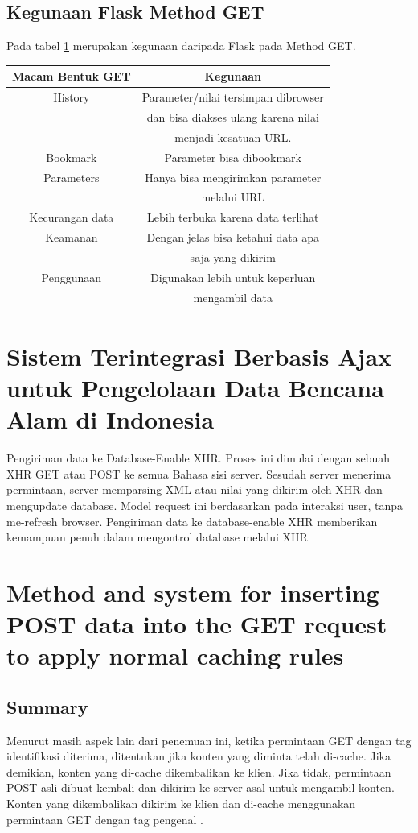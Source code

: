 \subsection{Kegunaan Flask Method GET}
Pada tabel \ref{table:contoh} merupakan kegunaan daripada Flask pada Method GET.
\begin{table}[h]
\begin{tabular}{|c|c|}
\hline
Macam Bentuk GET&Kegunaan\\
\hline
History&Parameter/nilai tersimpan dibrowser\\
&dan bisa diakses ulang karena nilai\\
&menjadi kesatuan URL.\\
Bookmark&Parameter bisa dibookmark\\
Parameters&Hanya bisa mengirimkan parameter\\
&melalui URL\\
Kecurangan data&Lebih terbuka karena data terlihat\\
Keamanan&Dengan jelas bisa ketahui data apa \\
&saja yang dikirim\\
Penggunaan&Digunakan lebih untuk keperluan \\
&mengambil data\\
\hline
\end{tabular}
\label{table:contoh}
\end{table}

\section{Sistem Terintegrasi Berbasis Ajax untuk Pengelolaan Data Bencana Alam di Indonesia}
Pengiriman data ke Database-Enable XHR. Proses ini dimulai dengan sebuah XHR GET atau POST ke semua Bahasa sisi server. Sesudah server menerima permintaan, server memparsing XML atau nilai yang dikirim oleh XHR dan mengupdate database. Model request ini berdasarkan pada interaksi user, tanpa me-refresh browser. Pengiriman data ke database-enable XHR memberikan kemampuan penuh dalam mengontrol database melalui XHR \cite{prasetyo2007sistem}

\section{Method and system for inserting POST data into the GET request to apply normal caching rules}
\subsection{Summary}
Menurut masih aspek lain dari penemuan ini, ketika permintaan GET dengan tag identifikasi diterima, ditentukan jika konten yang diminta telah di-cache. Jika demikian, konten yang di-cache dikembalikan ke klien. Jika tidak, permintaan POST asli dibuat kembali dan dikirim ke server asal untuk mengambil konten. Konten yang dikembalikan dikirim ke klien dan di-cache menggunakan permintaan GET dengan tag pengenal \cite{sloat2009method}.

